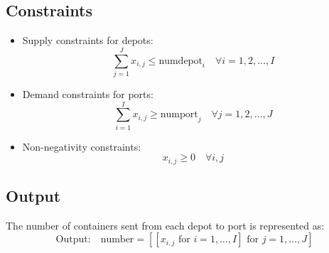 \documentclass{article}
\begin{document}
\subsection*{Constraints}
\begin{itemize}
    \item Supply constraints for depots:
    \[
    \sum_{j=1}^{J} x_{i,j} \leq \text{numdepot}_i \quad \forall i = 1, 2, \ldots, I
    \]
    
    \item Demand constraints for ports:
    \[
    \sum_{i=1}^{I} x_{i,j} \geq \text{numport}_j \quad \forall j = 1, 2, \ldots, J
    \]
    
    \item Non-negativity constraints:
    \[
    x_{i,j} \geq 0 \quad \forall i, j
    \]
\end{itemize}

\subsection*{Output}
The number of containers sent from each depot to port is represented as:
\[
\text{Output:} \quad \text{number} = [[x_{i,j} \text{ for } i = 1, \ldots, I] \text{ for } j = 1, \ldots, J]
\]
\end{document}
